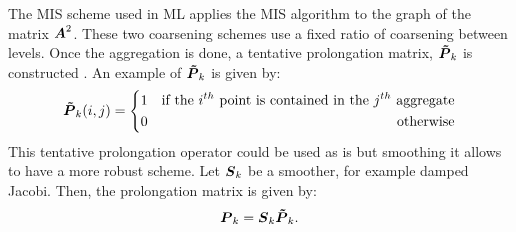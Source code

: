 The MIS scheme used in ML applies the MIS algorithm \cite{graph_coloring} to
the graph of the matrix $\boldsymbol{A}^2$. These two coarsening 
schemes use a fixed ratio of coarsening between levels. 
%
Once the aggregation is done, a tentative prolongation matrix, $\boldsymbol{\tilde{P}}_k$ 
is constructed \cite{mis}. An example of $\boldsymbol{\tilde{P}}_k$ is given by:
\begin{equation}
  \boldsymbol{\tilde{P}}_k(i,j) = \left\{
  \begin{aligned}
    &1 &\textrm{if the }i^{th}\textrm{ point is contained in the }j^{th}\textrm{
    aggregate}\\
    & 0 &\textrm{otherwise}
  \end{aligned}
  \right.
\end{equation}
This tentative prolongation operator could be used as is but smoothing it
allows to have a more robust scheme. Let $\boldsymbol{S}_k$ be a smoother, for example
damped Jacobi. Then, the prolongation matrix is given by:
\begin{equation}
  \boldsymbol{P}_k = \boldsymbol{S}_k \boldsymbol{\tilde{P}}_k.
\end{equation}

